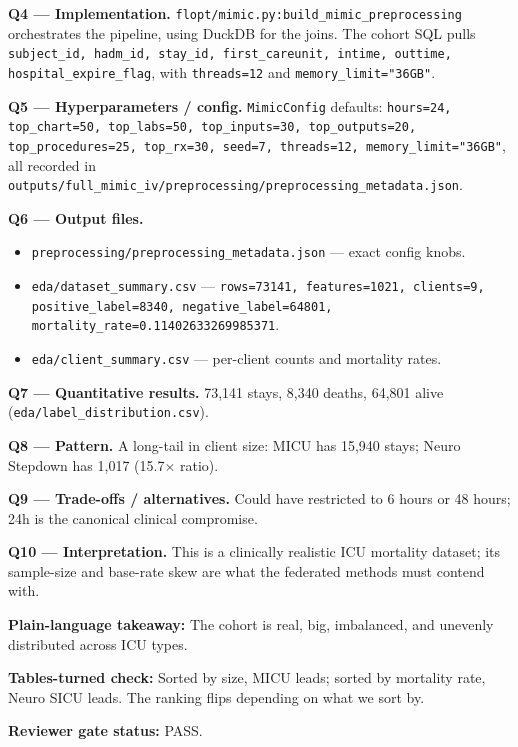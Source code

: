 \documentclass{article}
\begin{document}
\textbf{Q4 --- Implementation.} \texttt{flopt/mimic.py:build\_mimic\_preprocessing} orchestrates the pipeline, using DuckDB for the joins. The cohort SQL pulls \texttt{subject\_id, hadm\_id, stay\_id, first\_careunit, intime, outtime, hospital\_expire\_flag}, with \texttt{threads=12} and \texttt{memory\_limit="36GB"}.


\textbf{Q5 --- Hyperparameters / config.} \texttt{MimicConfig} defaults: \texttt{hours=24, top\_chart=50, top\_labs=50, top\_inputs=30, top\_outputs=20, top\_procedures=25, top\_rx=30, seed=7, threads=12, memory\_limit="36GB"}, all recorded in \texttt{outputs/full\_mimic\_iv/preprocessing/preprocessing\_metadata.json}.


\textbf{Q6 --- Output files.}

\begin{itemize}[leftmargin=1.4em,itemsep=2pt,topsep=2pt]
  \item \texttt{preprocessing/preprocessing\_metadata.json} --- exact config knobs.
  \item \texttt{eda/dataset\_summary.csv} --- \texttt{rows=73141, features=1021, clients=9, positive\_label=8340, negative\_label=64801, mortality\_rate=0.11402633269985371}.
  \item \texttt{eda/client\_summary.csv} --- per-client counts and mortality rates.
\end{itemize}


\textbf{Q7 --- Quantitative results.} 73,141 stays, 8,340 deaths, 64,801 alive (\texttt{eda/label\_distribution.csv}).


\textbf{Q8 --- Pattern.} A long-tail in client size: MICU has 15,940 stays; Neuro Stepdown has 1,017 (15.7\ensuremath{\times} ratio).


\textbf{Q9 --- Trade-offs / alternatives.} Could have restricted to 6 hours or 48 hours; 24h is the canonical clinical compromise.


\textbf{Q10 --- Interpretation.} This is a clinically realistic ICU mortality dataset; its sample-size and base-rate skew are what the federated methods must contend with.


\textbf{Plain-language takeaway:} The cohort is real, big, imbalanced, and unevenly distributed across ICU types.


\textbf{Tables-turned check:} Sorted by size, MICU leads; sorted by mortality rate, Neuro SICU leads. The ranking flips depending on what we sort by.


\textbf{Reviewer gate status:} PASS.
\end{document}

